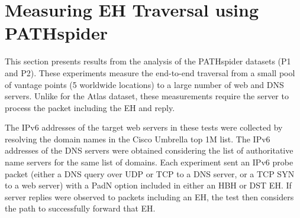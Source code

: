 \documentclass[conference]{IEEEtran}
\begin{document}

\section{Measuring EH Traversal using PATHspider} 
\label{sec:pathspider-results}

This section presents results from the analysis of the PATHspider datasets (P1 and P2).
These experiments measure the end-to-end traversal from a small
pool of vantage points (5 worldwide locations) to a large number of web and
DNS servers.  Unlike for the Atlas dataset, these
measurements require the server to process the packet including the EH and
reply.

The IPv6 addresses of the target web servers in these tests were collected by
resolving the domain names in the Cisco Umbrella top 1M list. The IPv6
addresses of the DNS servers were obtained considering the list of
authoritative name servers for the same list of domains.
Each experiment sent an IPv6 probe packet (either a DNS
query over UDP or TCP to a DNS server, or a TCP SYN to a web server) with a PadN option included in either an HBH or DST EH. If server replies were observed to packets including an EH, the test then considers the path to successfully forward that EH.

\end{document}
